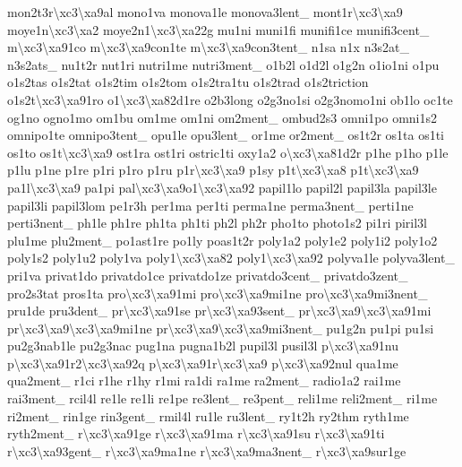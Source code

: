 {mon2t3r\textbackslash{}xc3\textbackslash{}xa9al mono1va monova1le monova3lent\-\_\- mont1r\textbackslash{}xc3\textbackslash{}xa9 moye1n\textbackslash{}xc3\textbackslash{}xa2 moye2n1\textbackslash{}xc3\textbackslash{}xa22g mu1ni muni1fi munifi1ce munifi3cent\-\_\- m\textbackslash{}xc3\textbackslash{}xa91co m\textbackslash{}xc3\textbackslash{}xa9con1te m\textbackslash{}xc3\textbackslash{}xa9con3tent\-\_\- n1sa n1x n3s2at\-\_\- n3s2ats\-\_\- nu1t2r nut1ri nutri1me nutri3ment\-\_\- o1b2l o1d2l o1g2n o1io1ni o1pu o1s2tas o1s2tat o1s2tim o1s2tom o1s2tra1tu o1s2trad o1s2triction o1s2t\textbackslash{}xc3\textbackslash{}xa91ro o1\textbackslash{}xc3\textbackslash{}xa82d1re o2b3long o2g3no1si o2g3nomo1ni ob1lo oc1te og1no ogno1mo om1bu om1me om1ni om2ment\-\_\- ombud2s3 omni1po omni1s2 omnipo1te omnipo3tent\-\_\- opu1le opu3lent\-\_\- or1me or2ment\-\_\- os1t2r os1ta os1ti os1to os1t\textbackslash{}xc3\textbackslash{}xa9 ost1ra ost1ri ostric1ti oxy1a2 o\textbackslash{}xc3\textbackslash{}xa81d2r p1he p1ho p1le p1lu p1ne p1re p1ri p1ro p1ru p1r\textbackslash{}xc3\textbackslash{}xa9 p1sy p1t\textbackslash{}xc3\textbackslash{}xa8 p1t\textbackslash{}xc3\textbackslash{}xa9 pa1l\textbackslash{}xc3\textbackslash{}xa9 pa1pi pal\textbackslash{}xc3\textbackslash{}xa9o1\textbackslash{}xc3\textbackslash{}xa92 papil1lo papil2l papil3la papil3le papil3li papil3lom pe1r3h per1ma per1ti perma1ne perma3nent\-\_\- perti1ne perti3nent\-\_\- ph1le ph1re ph1ta ph1ti ph2l ph2r pho1to photo1s2 pi1ri piril3l plu1me plu2ment\-\_\- po1ast1re po1ly poas1t2r poly1a2 poly1e2 poly1i2 poly1o2 poly1s2 poly1u2 poly1va poly1\textbackslash{}xc3\textbackslash{}xa82 poly1\textbackslash{}xc3\textbackslash{}xa92 polyva1le polyva3lent\-\_\- pri1va privat1do privatdo1ce privatdo1ze privatdo3cent\-\_\- privatdo3zent\-\_\- pro2s3tat pros1ta pro\textbackslash{}xc3\textbackslash{}xa91mi pro\textbackslash{}xc3\textbackslash{}xa9mi1ne pro\textbackslash{}xc3\textbackslash{}xa9mi3nent\-\_\- pru1de pru3dent\-\_\- pr\textbackslash{}xc3\textbackslash{}xa91se pr\textbackslash{}xc3\textbackslash{}xa93sent\-\_\- pr\textbackslash{}xc3\textbackslash{}xa9\textbackslash{}xc3\textbackslash{}xa91mi pr\textbackslash{}xc3\textbackslash{}xa9\textbackslash{}xc3\textbackslash{}xa9mi1ne pr\textbackslash{}xc3\textbackslash{}xa9\textbackslash{}xc3\textbackslash{}xa9mi3nent\-\_\- pu1g2n pu1pi pu1si pu2g3nab1le pu2g3nac pug1na pugna1b2l pupil3l pusil3l p\textbackslash{}xc3\textbackslash{}xa91nu p\textbackslash{}xc3\textbackslash{}xa91r2\textbackslash{}xc3\textbackslash{}xa92q p\textbackslash{}xc3\textbackslash{}xa91r\textbackslash{}xc3\textbackslash{}xa9 p\textbackslash{}xc3\textbackslash{}xa92nul qua1me qua2ment\-\_\- r1ci r1he r1hy r1mi ra1di ra1me ra2ment\-\_\- radio1a2 rai1me rai3ment\-\_\- rcil4l re1le re1li re1pe re3lent\-\_\- re3pent\-\_\- reli1me reli2ment\-\_\- ri1me ri2ment\-\_\- rin1ge rin3gent\-\_\- rmil4l ru1le ru3lent\-\_\- ry1t2h ry2thm ryth1me ryth2ment\-\_\- r\textbackslash{}xc3\textbackslash{}xa91ge r\textbackslash{}xc3\textbackslash{}xa91ma r\textbackslash{}xc3\textbackslash{}xa91su r\textbackslash{}xc3\textbackslash{}xa91ti r\textbackslash{}xc3\textbackslash{}xa93gent\-\_\- r\textbackslash{}xc3\textbackslash{}xa9ma1ne r\textbackslash{}xc3\textbackslash{}xa9ma3nent\-\_\- r\textbackslash{}xc3\textbackslash{}xa9sur1ge }
